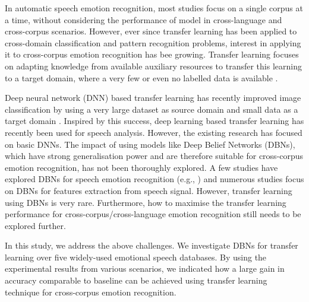 \documentclass[a4paper]{article}
\newcommand*{\JE}[1]{\textcolor{magenta}{#1}}
\begin{document}
In automatic speech emotion recognition, most studies focus on a single corpus at a time, without considering the performance of model in cross-language and cross-corpus scenarios.
However, ever since transfer learning has been applied to cross-domain classification and pattern recognition problems, interest in applying it to cross-corpus emotion recognition has bee growing. Transfer learning focuses on adapting knowledge from available auxiliary resources to transfer this learning to a target domain, where a very few or even no labelled data is available \cite{pan2010survey,lu2015transfer}. 

Deep neural network (DNN) based transfer learning has recently improved image classification by using a very large dataset as source domain and small data as a target domain \cite{sawada2015transfer}. 
Inspired by this success, deep learning based transfer learning has recently been used for speech analysis. However, the existing research has focused on basic DNNs. The impact of using models like Deep Belief Networks (DBNs), which have strong generalisation power and are therefore suitable for cross-corpus emotion recognition, has not been thoroughly explored. A few studies have explored DBNs for speech emotion recognition (e.g., \cite{le2013emotion,rana2016emotion}) and numerous studies focus on DBNs for features extraction \cite{xia2017multi,schmidt2011learning,huang2014research} from speech signal. However, transfer learning using DBNs is very rare. Furthermore, how to maximise the transfer learning performance for cross-corpus/cross-language emotion recognition still needs to be explored further.


 

In this study, we address the above challenges. We investigate DBNs for transfer learning over five widely-used emotional speech databases. By using the experimental results from various scenarios, we indicated how a large gain in accuracy comparable to baseline can be achieved using transfer learning technique for cross-corpus emotion recognition.
\end{document}
